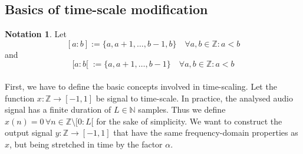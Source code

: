 \documentclass[letterpaper]{article}
\theoremstyle{definition}
\newtheorem*{notation}{Notation}
\theoremstyle{remark}
\theoremstyle{plain}
\begin{document}
\subsection{Basics of time-scale modification}
\begin{notation}
	Let
	\[[a:b]:=\{a,a+1,\dots,b-1,b\}\quad\forall a,b\in\mathbb{Z}:a<b\]
	and
	\[[a:b[\;:=\{a,a+1,\dots,b-1\}\quad\forall a,b\in\mathbb{Z}:a<b\]
\end{notation}

\paragraph{}
First, we have to define the basic concepts involved in time-scaling. Let the
function \(x:\mathbb{Z}\to[-1, 1]\) be signal to time-scale. In practice,
the analysed audio signal has a finite duration of \(L\in\mathbb{N}\) samples.
Thus we define \(x(n)=0\,\forall n\in\mathbb{Z}\setminus [0:L[ \) for the sake
of simplicity. We want to construct the output signal
\(y:\mathbb{Z}\to[-1, 1]\) that have the same frequency-domain properties as
\(x\), but being stretched in time by the factor \(\alpha\).
\end{document}
